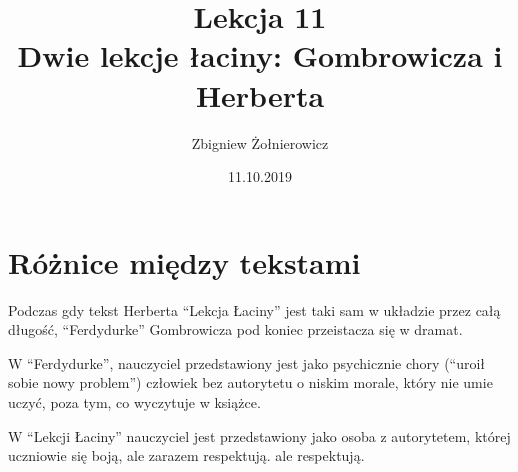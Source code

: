 \documentclass[a4paper]{article}
\begin{document}
\title{{\huge Lekcja 11} \\
{\large Dwie lekcje łaciny: Gombrowicza i Herberta}}
\author{Zbigniew Żołnierowicz}
\date{11.10.2019}
\maketitle
\section{Różnice między tekstami}
Podczas gdy tekst Herberta ``Lekcja Łaciny'' jest taki sam w układzie przez całą długość,
``Ferdydurke'' Gombrowicza pod koniec przeistacza się w dramat.

W ``Ferdydurke'', nauczyciel przedstawiony jest jako psychicznie chory (``uroił sobie nowy problem'') człowiek bez autorytetu o niskim morale,
który nie umie uczyć, poza tym, co wyczytuje w książce.

W ``Lekcji Łaciny'' nauczyciel jest przedstawiony jako osoba z autorytetem, której uczniowie się boją, ale zarazem respektują.
ale respektują.
\end{document}

